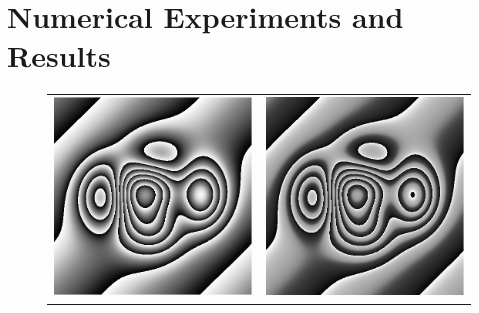 \documentclass[letterpaper,12pt]{article}   %
\begin{document}
\section{Numerical Experiments and Results}
\begin{figure}[ t]
	\begin{center}
		\begin{tabular}{c c}
			\includegraphics[scale=0.35]{figures/faseRST.png}}&
			\includegraphics[scale=0.35]{figures/faseAIA.png}}& \\

\end{tabular}
\end{center}
\end{figure}
\end{document}
